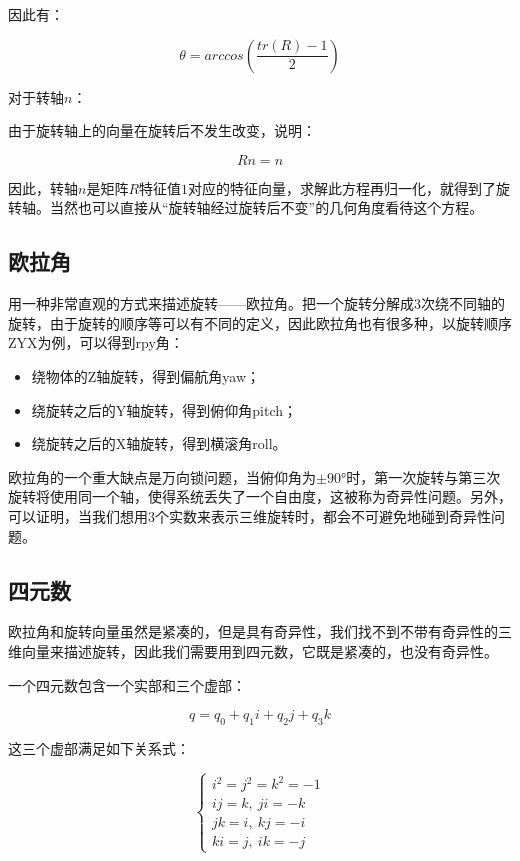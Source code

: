 \documentclass[9pt, oneside]{book}
\begin{document}
因此有：

\begin{equation}
    \theta = arccos(\frac{tr(R)-1}{2}) 
\end{equation}

对于转轴$n$：

由于旋转轴上的向量在旋转后不发生改变，说明：

\begin{equation}
    Rn = n
\end{equation}

因此，转轴$n$是矩阵$R$特征值$1$对应的特征向量，求解此方程再归一化，就得到了旋转轴。当然也可以直接从“旋转轴经过旋转后不变”的几何角度看待这个方程。

\subsection{欧拉角}

用一种非常直观的方式来描述旋转——欧拉角。把一个旋转分解成3次绕不同轴的旋转，由于旋转的顺序等可以有不同的定义，因此欧拉角也有很多种，以旋转顺序ZYX为例，可以得到rpy角：

\begin{itemize}
    \item 绕物体的Z轴旋转，得到偏航角yaw；
    \item 绕旋转之后的Y轴旋转，得到俯仰角pitch；
    \item 绕旋转之后的X轴旋转，得到横滚角roll。
\end{itemize}

欧拉角的一个重大缺点是万向锁问题，当俯仰角为$\pm90°$时，第一次旋转与第三次旋转将使用同一个轴，使得系统丢失了一个自由度，这被称为奇异性问题。另外，可以证明，当我们想用3个实数来表示三维旋转时，都会不可避免地碰到奇异性问题。

\subsection{四元数}

欧拉角和旋转向量虽然是紧凑的，但是具有奇异性，我们找不到不带有奇异性的三维向量来描述旋转，因此我们需要用到四元数，它既是紧凑的，也没有奇异性。

一个四元数包含一个实部和三个虚部：

\begin{equation}
    q = q_0 + q_1i + q_2j + q_3k
\end{equation}

这三个虚部满足如下关系式：

\begin{equation}
    \begin{cases}
        i^2 = j^2 = k^2 = -1 \\
        ij = k, \ ji = -k \\ 
        jk = i, \ kj = -i \\
        ki = j, \ ik = -j
     \end{cases}
\end{equation}
\end{document}
